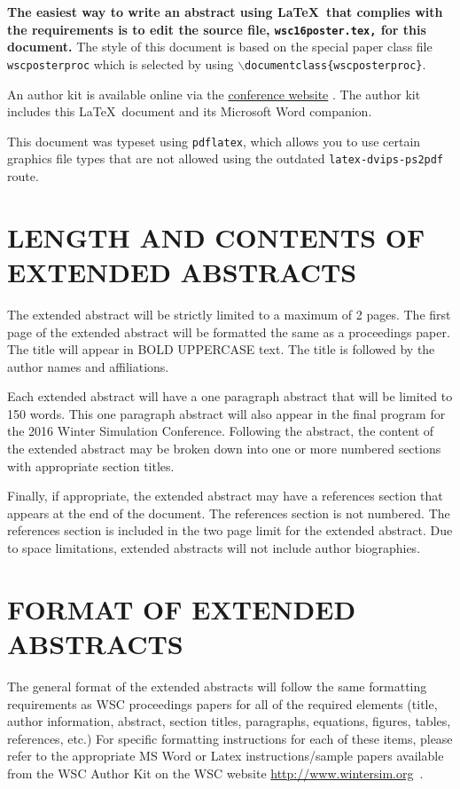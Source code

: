 \documentclass{wscposterproc}
\begin{document}
\textbf{The easiest way to write an abstract using \LaTeX\ that complies with the
requirements is to edit the source file, {\tt wsc16poster.tex,} for this document.}
The style of this document is based on the special paper class file {\tt wscposterproc} which is selected by using {\tt $\backslash$documentclass\{wscposterproc\}}.

An author kit is available online via the  \href{http://www.wintersim.org}%
{conference website} \cite{WSC}.
The author kit includes this \LaTeX\ document and its Microsoft Word companion.

This document was typeset using {\tt pdflatex}, which allows you to use certain
graphics file types that are not allowed using the outdated {\tt latex-dvips-ps2pdf} route.

\section{LENGTH AND CONTENTS OF EXTENDED ABSTRACTS}
The extended abstract will be strictly limited to a maximum  of 2 pages. The first page of the extended abstract will be formatted the same as a proceedings paper. The title will appear in BOLD UPPERCASE text. The title is followed by the author names and affiliations.

Each extended abstract will have a one paragraph abstract that will be limited to 150 words. This one paragraph abstract will also appear in the final program for the 2016 Winter Simulation Conference. Following the abstract, the content of the extended abstract may be broken down into one or more numbered sections with appropriate section titles.

Finally, if appropriate, the extended abstract may have a references section that appears at the end of the document. The references section is not numbered. The references section is included in the two page limit for the extended abstract. Due to space limitations, extended abstracts will not include author biographies.

\section{FORMAT OF EXTENDED ABSTRACTS}

The general format of the extended abstracts will follow the same formatting requirements as WSC proceedings papers for all of the required elements (title, author information, abstract, section titles, paragraphs, equations, figures, tables, references, etc.) For specific formatting instructions for each of these items, please refer to the appropriate MS Word or Latex instructions/sample papers available from the WSC Author Kit on the WSC website \url{http://www.wintersim.org}~\cite{WSC}.
\end{document}
